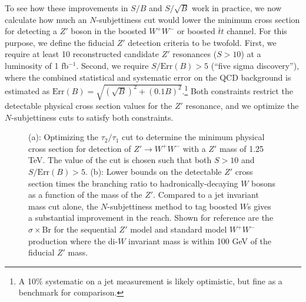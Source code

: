 \documentclass{JHEP3}
\newcommand{\vsh}{\vspace{-.5cm}}
\begin{document}
To see how these improvements in $S/B$ and $S/\sqrt{B}$ work in practice, we now calculate how much an $N$-subjettiness cut would lower the minimum cross section for detecting a $Z'$ boson in the boosted $W^+W^-$ or boosted $\bar{t}t$ channel.  For this purpose, we define the fiducial $Z'$ detection criteria to be twofold.  First, we require at least 10 reconstructed candidate $Z'$ resonances ($S > 10$) at a luminosity of 1 fb$^{-1}$.  Second, we require $S/\text{Err}(B) > 5$ (``five sigma discovery''), where the combined statistical and systematic error on the QCD background is estimated as $\text{Err}(B) = \sqrt{(\sqrt{B})^2 + (0.1 B)^2}$.\footnote{A 10\% systematic on a jet measurement is likely optimistic, but fine as a benchmark for comparison.}  Both constraints restrict the detectable physical cross section values for the $Z'$ resonance, and we optimize the $N$-subjettiness cuts to satisfy both constraints.

\begin{figure}[tp]
  \begin{center}
  \end{center}
\vsh
    \caption{(a): Optimizing the $\tau_2/\tau_1$ cut to determine the minimum physical cross section for detection of $Z' \rightarrow W^+ W^-$ with a $Z'$ mass of 1.25 TeV.  The value of the cut is chosen such that both $S > 10$ and $S/\text{Err}(B) > 5$.  (b): Lower bounds on the detectable $Z'$ cross section times the branching ratio to hadronically-decaying $W$ bosons as a function of the mass of the $Z'$.  Compared to a jet invariant mass cut alone, the $N$-subjettiness method to tag boosted $W$s gives a substantial improvement in the reach.  Shown for reference are the $\sigma \times \text{Br}$ for the sequential $Z'$ model and standard model $W^+W^-$ production where the di-$W$ invariant mass is within 100 GeV of the fiducial $Z'$ mass.}
    \label{fig:crossBoundW}
\end{figure}
\end{document}
